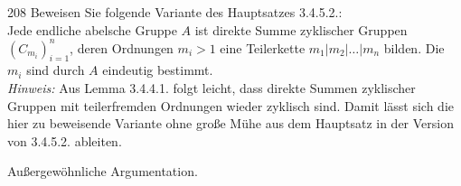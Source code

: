 \begin{algebraUE}{208}
Beweisen Sie folgende Variante des Hauptsatzes 3.4.5.2.: \\
Jede endliche abelsche Gruppe $A$ ist direkte Summe zyklischer Gruppen $(C_{m_i})_{i=1}^n$,
deren Ordnungen $m_i > 1$ eine Teilerkette $m_1 | m_2 | \dots | m_n$ bilden.
Die $m_i$ sind durch $A$ eindeutig bestimmt. \\
\textit{Hinweis:} Aus Lemma 3.4.4.1. folgt leicht, dass direkte Summen zyklischer
Gruppen mit teilerfremden Ordnungen wieder zyklisch sind. Damit lässt sich die
hier zu beweisende Variante ohne große Mühe aus dem Hauptsatz in der Version
von 3.4.5.2. ableiten.
\end{algebraUE}
\begin{solution}
Außergewöhnliche Argumentation.
\end{solution}
